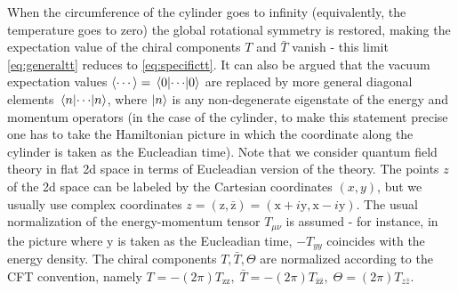  When the circumference of the cylinder goes to infinity (equivalently, the
 temperature goes to zero) the global rotational symmetry is  restored, making
 the expectation value of the chiral components $T$ and $\bar{T}$ vanish - this
 limit \eqref{eq:generaltt} reduces to \eqref{eq:specifictt}. It can also be
 argued that the vacuum expectation values $\langle\cdots\rangle
 = \mel{0}{\cdots}{0}$ are replaced by more general diagonal elements
 $\mel{n}{\cdots}{n}$, where $\ket{n}$ is any non-degenerate eigenstate of the
 energy and momentum operators (in the case of the cylinder, to make this
 statement precise one has to take the Hamiltonian picture in which the
 coordinate along the cylinder is taken as the Eucleadian time). Note that we
 consider quantum field theory in flat 2d space in terms of Eucleadian version
 of the theory. The points $z$ of the 2d space can be labeled by the Cartesian
 coordinates $(x,y)$, but we usually use complex coordinates
 $z=(\mathrm{z},\mathrm{\bar{z}}) = (\mathrm{x}+i\mathrm{y},
 \mathrm{x}-i\mathrm{y})$. The usual normalization of the energy-momentum
 tensor $T_{\mu\nu}$ is assumed - for instance, in the picture where
 $\mathrm{y}$ is taken as the Eucleadian time, $-T_{yy}$ coincides with the
 energy density. The chiral components $T,\bar{T},\Theta$ are normalized
 according to the CFT convention, namely
 $T=-(2\pi)T_{\mathrm{zz}},\;\bar{T}=-(2\pi)T_{\bar{\mathrm{z}}\bar{\mathrm{z}}},\;\Theta=(2\pi)T_{z\bar{z}}$.
